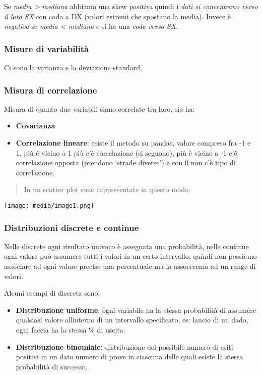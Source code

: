 Se \emph{media \textgreater{} mediana} abbiamo una skew \emph{positiva}
quindi i \emph{dati si concentrano verso il lato SX} con coda a DX
(valori estremi che spostano la media). Invece è \emph{negativa} se
\emph{media \textless{} mediana} e si ha una \emph{coda verso SX}.

\subsubsection{Misure di variabilità}\label{misure-di-variabilituxe0}

Ci sono la varianza e la deviazione standard.

\subsubsection{Misura di correlazione}\label{misura-di-correlazione}

Misura di quanto due variabili siano correlate tra loro, sia ha:

\begin{itemize}
\item
  \textbf{Covarianza}
\item
  \textbf{Correlazione lineare}: esiste il metodo su pandas, valore
  compreso fra -1 e 1, più è vicino a 1 più c'è correlazione (si
  seguono), più è vicino a -1 c'è correlazione opposta (prendono `strade
  diverse') e con 0 non c'è tipo di correlazione.
\end{itemize}

\begin{quote}
In un scatter plot sono rappresentate in questo modo:
\end{quote}

\texttt{[image: media/image1.png]}

\subsubsection{Distribuzioni discrete e
continue}\label{distribuzioni-discrete-e-continue}

Nelle discrete ogni risultato univoco è assegnata una probabilità, nelle
continue ogni valore può assumere tutti i valori in un certo intervallo,
quindi non possiamo associare ad ogni valore preciso una percentuale ma
la assoceremo ad un range di valori.

Alcuni esempi di discreta sono:

\begin{itemize}
\item
  \textbf{Distribuzione uniforme}: ogni variabile ha la stessa
  probabilità di assumere qualsiasi valore all\textquotesingle interno
  di un intervallo specificato, es: lancio di un dado, ogni faccia ha la
  stessa \% di uscita.
\item
  \textbf{Distribuzione binomiale:} distribuzione del possibile numero
  di esiti positivi in un dato numero di prove in ciascuna delle quali
  esiste la stessa probabilità di successo.
\end{itemize}

